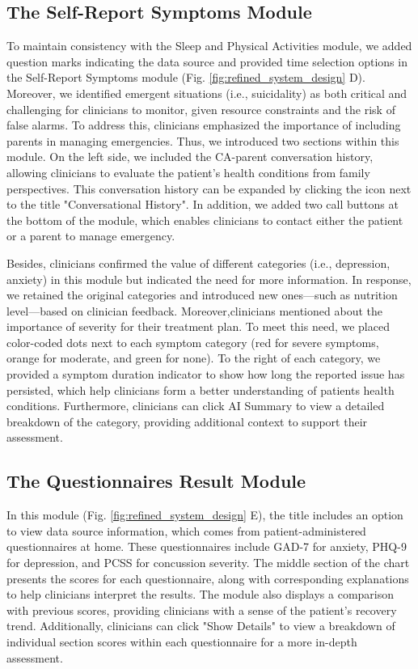 \subsection{The Self-Report Symptoms Module}
To maintain consistency with the Sleep and Physical Activities module, we added question marks indicating the data source and provided time selection options in the Self-Report Symptoms module (Fig. \ref{fig:refined_system_design} D).
Moreover, we identified emergent situations (i.e., suicidality) as both critical and challenging for clinicians to monitor, given resource constraints and the risk of false alarms. 
To address this, clinicians emphasized the importance of including parents in managing emergencies.
Thus, we introduced two sections within this module. 
On the left side, we included the CA-parent conversation history, allowing clinicians to evaluate the patient’s health conditions from family perspectives. 
This conversation history can be expanded by clicking the icon next to the title "Conversational History". 
In addition, we added two call buttons at the bottom of the module, which enables clinicians to contact either the patient or a parent to manage emergency.

Besides, clinicians confirmed the value of different categories (i.e., depression, anxiety) in this module but indicated the need for more information.
In response, we retained the original categories and introduced new ones—such as nutrition level—based on clinician feedback.
Moreover,clinicians mentioned about the importance of severity for their treatment plan.
To meet this need, we placed color-coded dots next to each symptom category (red for severe symptoms, orange for moderate, and green for none). 
To the right of each category, we provided a symptom duration indicator to show how long the reported issue has persisted, which help clinicians form a better understanding of patients health conditions.
Furthermore, clinicians can click AI Summary to view a detailed breakdown of the category, providing additional context to support their assessment. 


\subsection{The Questionnaires Result Module}
In this module (Fig. \ref{fig:refined_system_design} E), the title includes an option to view data source information, which comes from patient-administered questionnaires at home. These questionnaires include GAD-7 for anxiety, PHQ-9 for depression, and PCSS for concussion severity. The middle section of the chart presents the scores for each questionnaire, along with corresponding explanations to help clinicians interpret the results. The module also displays a comparison with previous scores, providing clinicians with a sense of the patient’s recovery trend. Additionally, clinicians can click "Show Details" to view a breakdown of individual section scores within each questionnaire for a more in-depth assessment.

